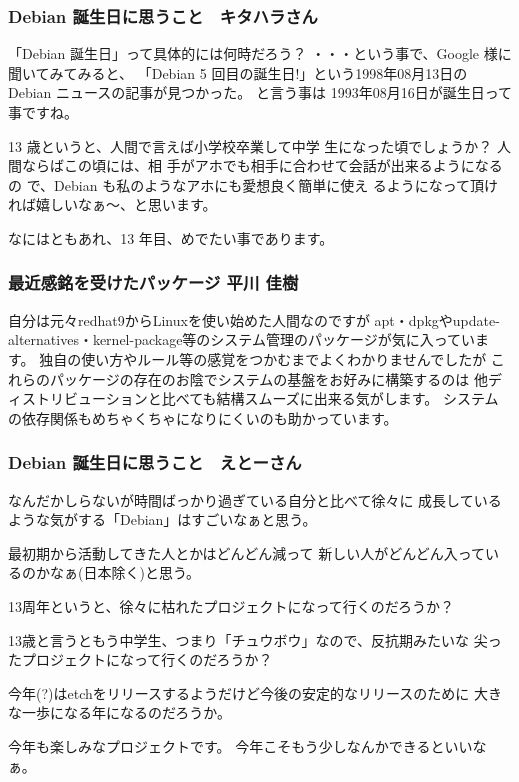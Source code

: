 \documentclass[mingoth,a4paper]{jsarticle}
\begin{document}
\subsubsection{Debian 誕生日に思うこと　キタハラさん}

    「Debian 誕生日」って具体的には何時だろう？
・・・という事で、Google 様に聞いてみてみると、
「Debian 5 回目の誕生日!」という1998年08月13日の
Debian ニュースの記事が見つかった。  と言う事は
1993年08月16日が誕生日って事ですね。

    13 歳というと、人間で言えば小学校卒業して中学
生になった頃でしょうか？  人間ならばこの頃には、相
手がアホでも相手に合わせて会話が出来るようになるの
で、Debian も私のようなアホにも愛想良く簡単に使え
るようになって頂ければ嬉しいなぁ〜、と思います。

    なにはともあれ、13 年目、めでたい事であります。

\subsubsection{最近感銘を受けたパッケージ 平川 佳樹}

自分は元々redhat9からLinuxを使い始めた人間なのですが
apt・dpkgやupdate-alternatives・kernel-package等のシステム管理のパッケージが気に入っています。
独自の使い方やルール等の感覚をつかむまでよくわかりませんでしたが
これらのパッケージの存在のお陰でシステムの基盤をお好みに構築するのは
他ディストリビューションと比べても結構スムーズに出来る気がします。
システムの依存関係もめちゃくちゃになりにくいのも助かっています。

\subsubsection{Debian 誕生日に思うこと　えとーさん}

なんだかしらないが時間ばっかり過ぎている自分と比べて徐々に
成長しているような気がする「Debian」はすごいなぁと思う。

最初期から活動してきた人とかはどんどん減って
新しい人がどんどん入っているのかなぁ(日本除く)と思う。

13周年というと、徐々に枯れたプロジェクトになって行くのだろうか？

13歳と言うともう中学生、つまり「チュウボウ」なので、反抗期みたいな
尖ったプロジェクトになって行くのだろうか？

今年(?)はetchをリリースするようだけど今後の安定的なリリースのために
大きな一歩になる年になるのだろうか。

今年も楽しみなプロジェクトです。
今年こそもう少しなんかできるといいなぁ。
\end{document}
